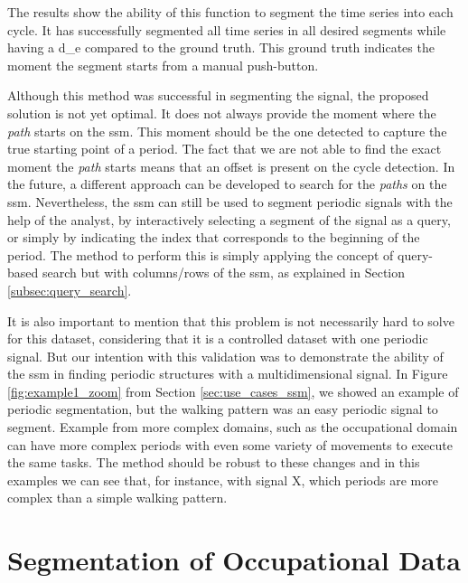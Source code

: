 The results show the ability of this function to segment the time series into each cycle. It has successfully segmented all time series in all desired segments while having a \gls{d_e} compared to the ground truth. This ground truth indicates the moment the segment starts from a manual push-button.
\par
Although this method was successful in segmenting the signal, the proposed solution is not yet optimal. It does not always provide the moment where the \textit{path} starts on the \gls{ssm}. This moment should be the one detected to capture the true starting point of a period. The fact that we are not able to find the exact moment the \textit{path} starts means that an offset is present on the cycle detection. In the future, a different approach can be developed to search for the \textit{paths} on the \gls{ssm}. Nevertheless, the \gls{ssm} can still be used to segment periodic signals with the help of the analyst, by interactively selecting a segment of the signal as a query, or simply by indicating the index that corresponds to the beginning of the period. The method to perform this is simply applying the concept of query-based search but with columns/rows of the \gls{ssm}, as explained in Section \ref{subsec:query_search}.
\par
It is also important to mention that this problem is not necessarily hard to solve for this dataset, considering that it is a controlled dataset with one periodic signal. But our intention with this validation was to demonstrate the ability of the \gls{ssm} in finding periodic structures with a multidimensional signal. In Figure \ref{fig:example1_zoom} from Section \ref{sec:use_cases_ssm}, we showed an example of periodic segmentation, but the walking pattern was an easy periodic signal to segment. Example from more complex domains, such as the occupational domain can have more complex periods with even some variety of movements to execute the same tasks. The method should be robust to these changes and in this examples we can see that, for instance, with signal X, which periods are more complex than a simple walking pattern.

\section{Segmentation of Occupational Data}

